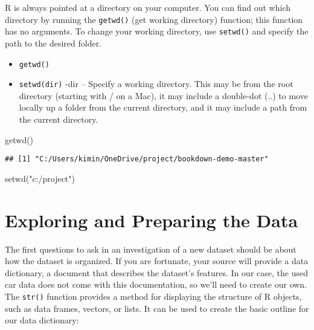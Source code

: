 \documentclass[
]{book}
\newenvironment{Shaded}{\begin{snugshade}}{\end{snugshade}}
\newcommand{\FunctionTok}[1]{\textcolor[rgb]{0.00,0.00,0.00}{#1}}
\newcommand{\NormalTok}[1]{#1}
\newcommand{\StringTok}[1]{\textcolor[rgb]{0.31,0.60,0.02}{#1}}
\providecommand{\tightlist}{%
  \setlength{\itemsep}{0pt}\setlength{\parskip}{0pt}}
\begin{document}
R is always pointed at a directory on your computer. You can find out which directory by running the \texttt{getwd()} (get working directory) function; this function has no arguments. To change your working directory, use \texttt{setwd()} and specify the path to the desired folder.

\begin{itemize}
\tightlist
\item
  \texttt{getwd()}
\item
  \texttt{setwd(dir)}
  -dir -- Specify a working directory. This may be from the root directory (starting with / on a Mac), it may include a double-dot (..) to move locally up a folder from the current directory, and it may include a path from the current directory.
\end{itemize}

\begin{Shaded}
\begin{Highlighting}[]
\FunctionTok{getwd}\NormalTok{()}
\end{Highlighting}
\end{Shaded}

\begin{verbatim}
## [1] "C:/Users/kimin/OneDrive/project/bookdown-demo-master"
\end{verbatim}

\begin{Shaded}
\begin{Highlighting}[]
\FunctionTok{setwd}\NormalTok{(}\StringTok{"c:/project"}\NormalTok{)}
\end{Highlighting}
\end{Shaded}

\hypertarget{exploring-and-preparing-the-data-1}{%
\section{Exploring and Preparing the Data}\label{exploring-and-preparing-the-data-1}}

The first questions to ask in an investigation of a new dataset should be about
how the dataset is organized. If you are fortunate, your source will provide a data
dictionary, a document that describes the dataset's features. In our case, the used
car data does not come with this documentation, so we'll need to create our own.
The \texttt{str()} function provides a method for displaying the structure of R objects,
such as data frames, vectors, or lists. It can be used to create the basic outline for our data dictionary:
\end{document}
